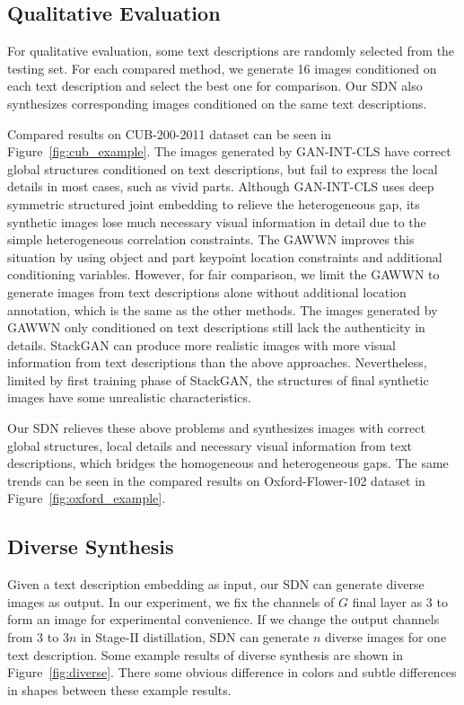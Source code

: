 \documentclass[sigconf]{acmart}
\begin{document}
\subsection{Qualitative Evaluation}

For qualitative evaluation, some text descriptions are randomly selected from the testing set. For each compared method, we generate 16 images conditioned on each text description and select the best one for comparison. Our SDN also synthesizes corresponding images conditioned on the same text descriptions.

Compared results on CUB-200-2011 dataset can be seen in Figure~\ref{fig:cub_example}. The images generated by GAN-INT-CLS have correct global structures conditioned on text descriptions, but fail to express the local details in most cases, such as vivid parts. Although GAN-INT-CLS uses deep symmetric structured joint embedding to relieve the heterogeneous gap, its synthetic images lose much necessary visual information in detail due to the simple heterogeneous correlation constraints. The GAWWN improves this situation by using object and part keypoint location constraints and additional conditioning variables. However, for fair comparison, we limit the GAWWN to generate images from text descriptions alone without additional location annotation, which is the same as the other methods. The images generated by GAWWN only conditioned on text descriptions still lack the authenticity in details. StackGAN can produce more realistic images with more visual information from text descriptions than the above approaches. Nevertheless, limited by first training phase of StackGAN, the structures of final synthetic images have some unrealistic characteristics. 	

Our SDN relieves these above problems and synthesizes images with correct global structures, local details and necessary visual information from text descriptions, which bridges the homogeneous and heterogeneous gaps. The same trends can be seen in the compared results on Oxford-Flower-102 dataset in Figure~\ref{fig:oxford_example}. 

\subsection{Diverse Synthesis}
Given a text description embedding as input, our SDN can generate diverse images as output. In our experiment, we fix the channels of $G$ final layer as $3$ to form an image for experimental convenience. If we change the output channels from $3$ to $3n$ in Stage-II distillation, SDN can generate $n$ diverse images for one text description. Some example results of diverse synthesis are shown in Figure~\ref{fig:diverse}. There some obvious difference in colors and subtle differences in shapes between these example results.
\end{document}
